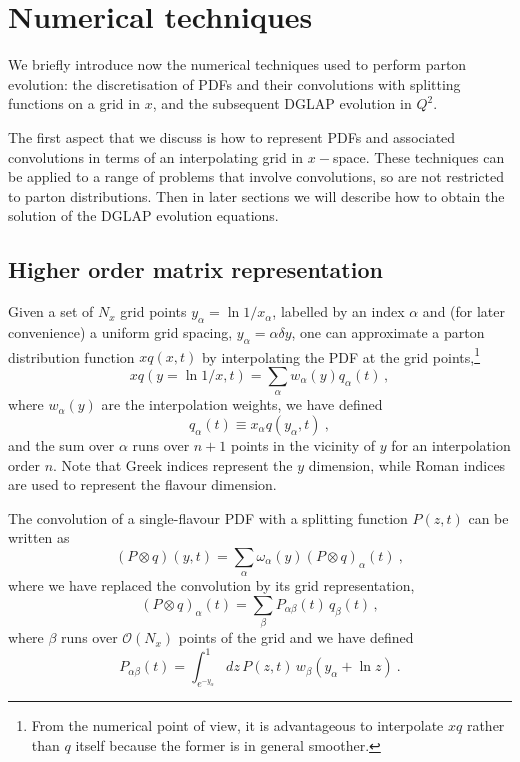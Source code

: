 \documentclass[12pt]{article}
\newcommand{\lp}{\left(}
\newcommand{\rp}{\right)}
\begin{document}
\section{Numerical techniques}
\label{tricks}
We briefly introduce now the numerical techniques used to perform
parton evolution: the discretisation of PDFs and
their convolutions with splitting functions on a grid in $x$,
and the subsequent DGLAP evolution in $Q^2$. 

The first aspect that we discuss is how to represent PDFs
and associated convolutions in terms of an interpolating grid
in $x-$space.
These techniques can be applied to a range of problems
that involve convolutions, so are not restricted
to parton distributions. Then in later sections we will describe how
to obtain the solution of the DGLAP evolution equations.

\subsection{Higher order matrix representation}
\label{sec:highord}


Given a set of $N_x$ grid points $y_\alpha=\ln 1/x_{\alpha}$, 
labelled by an
index $\alpha$ and
(for later convenience) a uniform grid spacing, $y_\alpha = \alpha \delta
y$, one can approximate a parton distribution function 
$xq \lp x,t \rp$ by
interpolating the PDF at the grid points,\footnote{From the 
numerical point of view, it is
advantageous to interpolate $xq$ rather than $q$ itself because
the former is in general smoother.}
\begin{equation}
  xq(y=\ln 1/x,t) = \sum_\alpha w_\alpha(y) q_\alpha(t)\,,
\end{equation}
where $w_\alpha(y)$ are the interpolation weights, 
we have defined
\begin{equation}
 q_{\alpha}(t) \equiv
x_{\alpha}q(y_\alpha,t) \ ,
\end{equation}
and the sum over $\alpha$ runs over $n+1$ points in the
vicinity of $y$ for an interpolation order $n$. Note that Greek
indices represent the $y$ dimension, while  Roman indices
are  used to represent the flavour dimension.


The convolution of a single-flavour PDF with a splitting function
$P(z,t)$ can be written as
\begin{equation}
  (P \otimes q)(y,t) = \sum_{\alpha} \omega_{\alpha}(y)
 (P \otimes q)_\alpha(t) \ ,
\end{equation}
where we have replaced the convolution by its grid representation,
\begin{equation}
  (P \otimes q)_\alpha(t) = \sum_{\beta} P_{\alpha\beta}(t) \, q_\beta(t)\,,
\end{equation}
where $\beta$ runs over $\mathcal{O}\lp N_x \rp$ points of the grid and we have
defined
\begin{equation}
  \label{eq:Palphabeta}
  P_{\alpha\beta}(t) = \int_{e^{-y_{\alpha}}}^1 dz
 \,P(z,t)\, w_\beta(y_\alpha + \ln z)\  .
\end{equation}
\end{document}
